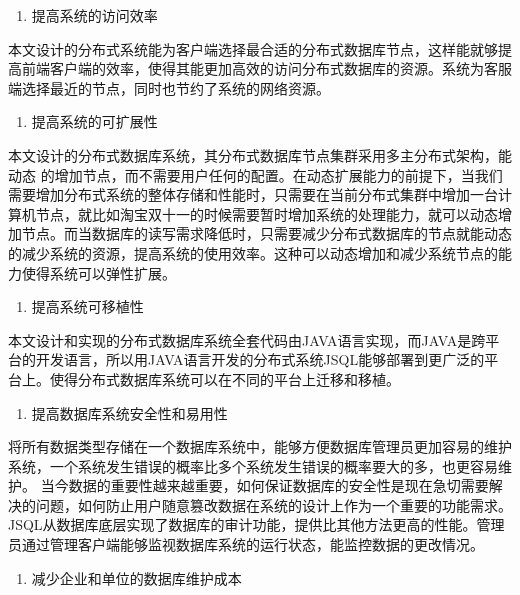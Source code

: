 	\begin{enumerate}[resume]
		\item 提高系统的访问效率
	\end{enumerate}

	本文设计的分布式系统能为客户端选择最合适的分布式数据库节点，这样能就够提高前端客户端的效率，使得其能更加高效的访问分布式数据库的资源。系统为客服端选择最近的节点，同时也节约了系统的网络资源。
	
	\begin{enumerate}[resume]
		\item 提高系统的可扩展性
	\end{enumerate}

	本文设计的分布式数据库系统，其分布式数据库节点集群采用多主分布式架构，能动态
	的增加节点，而不需要用户任何的配置。在动态扩展能力的前提下，当我们需要增加分布式系统的整体存储和性能时，只需要在当前分布式集群中增加一台计算机节点，就比如淘宝双十一的时候需要暂时增加系统的处理能力，就可以动态增加节点。而当数据库的读写需求降低时，只需要减少分布式数据库的节点就能动态的减少系统的资源，提高系统的使用效率。这种可以动态增加和减少系统节点的能力使得系统可以弹性扩展。
	
	\begin{enumerate}[resume]
		\item 提高系统可移植性
	\end{enumerate}

	本文设计和实现的分布式数据库系统全套代码由JAVA语言实现，而JAVA是跨平台的开发语言，所以用JAVA语言开发的分布式系统JSQL能够部署到更广泛的平台上。使得分布式数据库系统可以在不同的平台上迁移和移植。
	
	\begin{enumerate}[resume]
		\item 提高数据库系统安全性和易用性
	\end{enumerate}

将所有数据类型存储在一个数据库系统中，能够方便数据库管理员更加容易的维护系统，一个系统发生错误的概率比多个系统发生错误的概率要大的多，也更容易维护。
	当今数据的重要性越来越重要，如何保证数据库的安全性是现在急切需要解决的问题，如何防止用户随意篡改数据在系统的设计上作为一个重要的功能需求。JSQL从数据库底层实现了数据库的审计功能，提供比其他方法更高的性能。管理员通过管理客户端能够监视数据库系统的运行状态，能监控数据的更改情况。
	
		\begin{enumerate}[resume]
		\item 减少企业和单位的数据库维护成本
	\end{enumerate}
	
